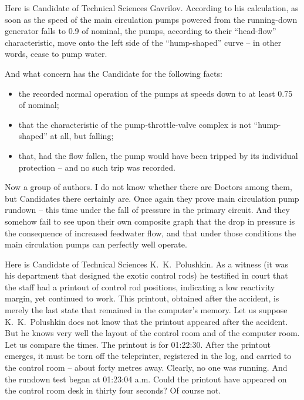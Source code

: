 \documentclass[openright]{bookest}
\begin{document}
Here is Candidate of Technical Sciences Gavrilov. According to his calculation, as soon as the speed of the main circulation pumps powered from the running-down generator falls to \num{0.9} of nominal, the pumps, according to their ``head-flow'' characteristic, move onto the left side of the ``hump-shaped'' curve -- in other words, cease to pump water.

And what concern has the Candidate for the following facts:

\begin{itemize}
\item the recorded normal operation of the pumps at speeds down to at least \num{0.75} of nominal;
\item that the characteristic of the pump-throttle-valve complex is not ``hump-shaped'' at all, but falling;
\item that, had the flow fallen, the pump would have been tripped by its individual protection -- and no such trip was recorded.
\end{itemize}

Now a group of authors. I do not know whether there are Doctors among them, but Candidates there certainly are. Once again they prove main circulation pump rundown -- this time under the fall of pressure in the primary circuit. And they somehow fail to see upon their own composite graph that the drop in pressure is the consequence of increased feedwater flow, and that under those conditions the main circulation pumps can perfectly well operate.

Here is Candidate of Technical Sciences K.~K.~Polushkin. As a witness (it was his department that designed the exotic control rods) he testified in court that the staff had a printout of control rod positions, indicating a low reactivity margin, yet continued to work. This printout, obtained after the accident, is merely the last state that remained in the computer's memory. Let us suppose K.~K.~Polushkin does not know that the printout appeared after the accident. But he knows very well the layout of the control room and of the computer room. Let us compare the times. The printout is for 01:22:30. After the printout emerges, it must be torn off the teleprinter, registered in the log, and carried to the control room -- about forty metres away. Clearly, no one was running. And the rundown test began at 01:23:04 a.m. Could the printout have appeared on the control room desk in thirty four seconds? Of course not.
\end{document}
